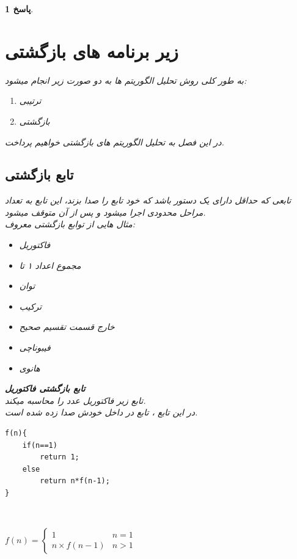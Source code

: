 \documentclass[12pt]{article}
\newtheorem{answer}{پاسخ}[section]
\begin{document}
\begin{answer}
\newpage

\section{زیر برنامه های بازگشتی}

به طور کلی روش تحلیل الگوریتم ها به دو صورت زیر انجام میشود:\\
\begin{enumerate}
	\item 
	ترتیبی
	\item 
	بازگشتی
\end{enumerate}

در این فصل به تحلیل الگوریتم های بازگشتی خواهیم پرداخت.\\

\subsection{\textbf{تابع بازگشتی }}

تابعی که حداقل دارای یک دستور باشد که خود تابع را صدا بزند، این تابع به تعداد مراحل محدودی اجرا میشود و پس از آن متوقف میشود.\\

مثال هایی از توابع بازگشتی معروف:
\begin{itemize}
	\item
	فاکتوریل
	\item
	 مجموع اعداد ۱ تا 
	\item
	 توان
	\item
	 ترکیب
	\item
	خارج قسمت تقسیم صحیح
	\item
	فیبوناچی
	\item
	 هانوی
\end{itemize}
\newpage
\textbf{تابع بازگشتی فاکتوریل}\\
تابع زیر فاکتوریل عدد  را محاسبه میکند.\\
در این تابع ، تابع  در داخل خودش صدا زده شده است.
\begin{latin}
\begin{lstlisting}
f(n){
	if(n==1)
		return 1;
	else
		return n*f(n-1);
}
\end{lstlisting}
\end{latin}\\

\begin{LTR}
\begin{math}
	f(n) =
\begin{cases}
	1 & n=1\\
	n\times f(n-1) &n>1
\end{cases}
\end{math}
\end{LTR}


\end{answer}
\end{document}
